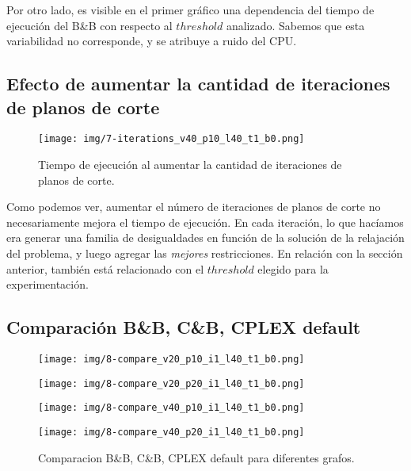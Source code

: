 Por otro lado, es visible en el primer gráfico una dependencia del tiempo de ejecución del B\&B con respecto al $threshold$ analizado. Sabemos que esta variabilidad no corresponde, y se atribuye a ruido del CPU.

\subsection{Efecto de aumentar la cantidad de iteraciones de planos de corte}

\begin{figure}[h]
\centering
\texttt{[image: img/7-iterations\_v40\_p10\_l40\_t1\_b0.png]}
\caption{Tiempo de ejecución al aumentar la cantidad de iteraciones de planos de corte.}
\end{figure}

Como podemos ver, aumentar el número de iteraciones de planos de corte no necesariamente mejora el tiempo de ejecución. En cada iteración, lo que hacíamos era generar una familia de desigualdades en función de la solución de la relajación del problema, y luego agregar las \textit{mejores} restricciones. En relación con la sección anterior, también está relacionado con el $threshold$ elegido para la experimentación.

\pagebreak

\subsection{Comparación B\&B, C\&B, CPLEX default}

\begin{figure}[h]
  \centering
  \begin{minipage}[b]{0.49\textwidth}
    \texttt{[image: img/8-compare\_v20\_p10\_i1\_l40\_t1\_b0.png]}
  \end{minipage}
  \hfill
  \begin{minipage}[b]{0.49\textwidth}
    \texttt{[image: img/8-compare\_v20\_p20\_i1\_l40\_t1\_b0.png]}
  \end{minipage}
  \begin{minipage}[b]{0.49\textwidth}
    \texttt{[image: img/8-compare\_v40\_p10\_i1\_l40\_t1\_b0.png]}
  \end{minipage}
  \hfill
  \begin{minipage}[b]{0.49\textwidth}
    \texttt{[image: img/8-compare\_v40\_p20\_i1\_l40\_t1\_b0.png]}
  \end{minipage}
	\caption{Comparacion B\&B, C\&B, CPLEX default para diferentes grafos.}
\end{figure}

